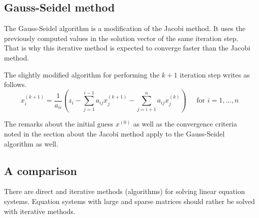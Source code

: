 \subsection{Gauss-Seidel method}

The Gauss-Seidel algorithm is a modification of the Jacobi method.  It
uses the previously computed values in the solution vector of the same
iteration step.  That is why this iterative method is expected to
converge faster than the Jacobi method.

\addvspace{12pt}

The slightly modified algorithm for performing the $k + 1$ iteration
step writes as follows.
\begin{equation}
x_{i}^{(k+1)} = \dfrac{1}{a_{ii}}\left(z_i - \sum_{j=1}^{i-1} a_{ij}x_{j}^{(k+1)} - \sum_{j=i+1}^{n} a_{ij}x_{j}^{(k)}\right)
\;\;\;\; \textrm{ for } i = 1, \ldots, n
\end{equation}

The remarks about the initial guess $x^{(0)}$ as well as the
convergence criteria noted in the section about the Jacobi method
apply to the Gauss-Seidel algorithm as well.

\subsection{A comparison}

There are direct and iterative methods (algorithms) for solving linear
equation systems.  Equation systems with large and sparse matrices
should rather be solved with iterative methods.

\addvspace{12pt}


